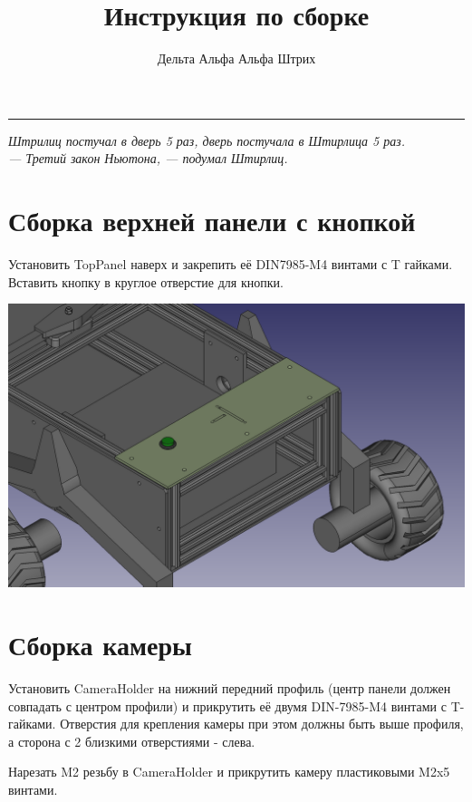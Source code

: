 \documentclass[12pt,a4paper,oneside]{article}
\title{\textbf{Инструкция по сборке}}
\author{Дельта Альфа Альфа Штрих}
\date{}
\begin{document}
\maketitle

\noindent\rule{\textwidth}{1pt}

\begin{flushright}
    \textit{Штрилиц постучал в дверь 5 раз, дверь постучала в Штирлица 5 раз.\\
        — Третий закон Ньютона, — подумал Штирлиц.}
\end{flushright}


\section{Сборка верхней панели с кнопкой}
Установить TopPanel наверх и закрепить её DIN7985-M4 винтами с T гайками.
Вставить кнопку в круглое отверстие для кнопки.

\includegraphics[width=\textwidth]{toppanel}

\section{Сборка камеры}
Установить CameraHolder на нижний передний профиль (центр панели должен
совпадать с центром профили) и прикрутить её двумя DIN-7985-M4 винтами с
T-гайками. Отверстия для крепления камеры при этом должны быть выше профиля, а
сторона с 2 близкими отверстиями - слева.

Нарезать M2 резьбу в CameraHolder и прикрутить камеру пластиковыми M2x5 винтами.
\end{document}
